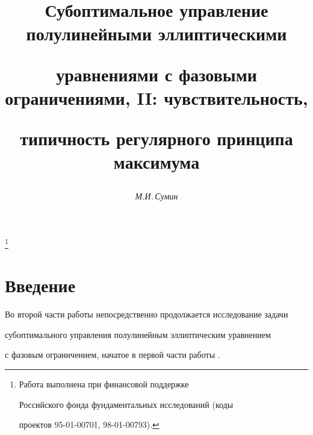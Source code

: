 










\author{\it М.И.\,Сумин} 




\title{Субоптимальное управление полулинейными эллиптическими


уравнениями с фазовыми ограничениями, II: чувствительность,


типичность регулярного принципа максимума}


\thanks{Работа выполнена при финансовой поддержке


Российского фонда фундаментальных исследований (коды


проектов 95-01-00701, 98-01-00793).}





\date{} 




\pagestyle{plain} %


 




\maketitle 


\label{begin} 





\section{Введение}





Во второй части работы непосредственно продолжается исследование задачи


субоптимального управления полулинейным эллиптическим уравнением


с фазовым ограничением, начатое в первой части работы \cite{sumin98}.


